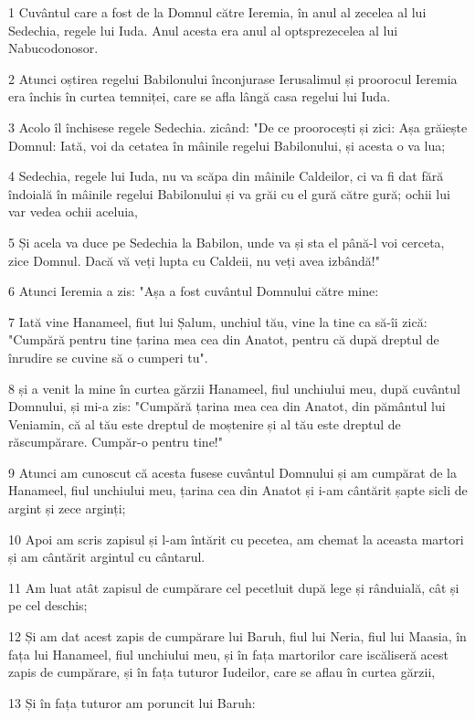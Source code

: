 \par 1 Cuvântul care a fost de la Domnul către Ieremia, în anul al zecelea al lui Sedechia, regele lui Iuda. Anul acesta era anul al optsprezecelea al lui Nabucodonosor.
\par 2 Atunci oștirea regelui Babilonului înconjurase Ierusalimul și proorocul Ieremia era închis în curtea temniței, care se afla lângă casa regelui lui Iuda.
\par 3 Acolo îl închisese regele Sedechia. zicând: "De ce proorocești și zici: Așa grăiește Domnul: Iată, voi da cetatea în mâinile regelui Babilonului, și acesta o va lua;
\par 4 Sedechia, regele lui Iuda, nu va scăpa din mâinile Caldeilor, ci va fi dat fără îndoială în mâinile regelui Babilonului și va grăi cu el gură către gură; ochii lui var vedea ochii aceluia,
\par 5 Și acela va duce pe Sedechia la Babilon, unde va și sta el până-l voi cerceta, zice Domnul. Dacă vă veți lupta cu Caldeii, nu veți avea izbândă!"
\par 6 Atunci Ieremia a zis: "Așa a fost cuvântul Domnului către mine:
\par 7 Iată vine Hanameel, fiut lui Șalum, unchiul tău, vine la tine ca să-îi zică: "Cumpără pentru tine țarina mea cea din Anatot, pentru că după dreptul de înrudire se cuvine să o cumperi tu".
\par 8 și a venit la mine în curtea gărzii Hanameel, fiul unchiului meu, după cuvântul Domnului, și mi-a zis: "Cumpără țarina mea cea din Anatot, din pământul lui Veniamin, că al tău este dreptul de moștenire și al tău este dreptul de răscumpărare. Cumpăr-o pentru tine!"
\par 9 Atunci am cunoscut că acesta fusese cuvântul Domnului și am cumpărat de la Hanameel, fiul unchiului meu, țarina cea din Anatot și i-am cântărit șapte sicli de argint și zece arginți;
\par 10 Apoi am scris zapisul și l-am întărit cu pecetea, am chemat la aceasta martori și am cântărit argintul cu cântarul.
\par 11 Am luat atât zapisul de cumpărare cel pecetluit după lege și rânduială, cât și pe cel deschis;
\par 12 Și am dat acest zapis de cumpărare lui Baruh, fiul lui Neria, fiul lui Maasia, în fața lui Hanameel, fiul unchiului meu, și în fața martorilor care iscăliseră acest zapis de cumpărare, și în fața tuturor Iudeilor, care se aflau în curtea gărzii,
\par 13 Și în fața tuturor am poruncit lui Baruh:
